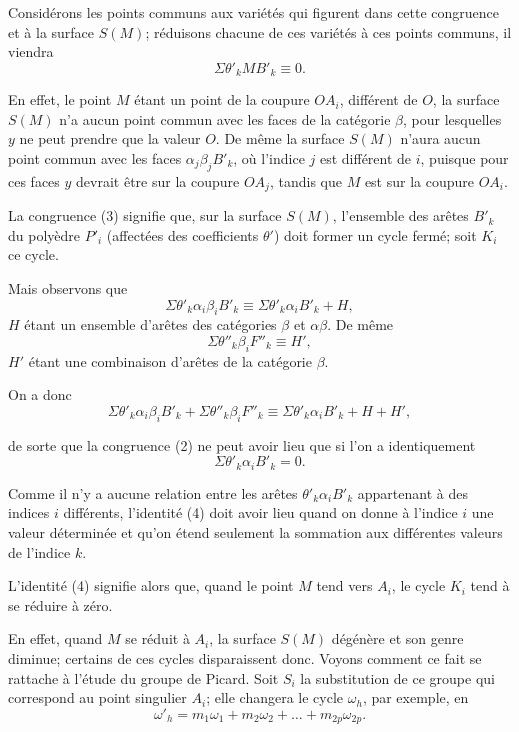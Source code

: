 \documentclass{article}
\begin{document}
Considérons les points communs aux variétés qui figurent dans cette congruence et à la surface $S(M)$; réduisons chacune de ces variétés à ces points communs, il viendra
\[ \Sigma \theta'_{k} MB'_{k} \equiv 0. \tag{3} \]

En effet, le point $M$ étant un point de la coupure $OA_{i}$, différent de $O$, la surface $S(M)$ n'a aucun point commun avec les faces de la catégorie $\beta$, pour lesquelles $y$ ne peut prendre que la valeur $O$. De même la surface $S(M)$ n'aura aucun point commun avec les faces $\alpha_{j}\beta_{j}B'_{k}$, où l'indice $j$ est différent de $i$, puisque pour ces faces $y$ devrait être sur la coupure $OA_{j}$, tandis que $M$ est sur la coupure $OA_{i}$.

La congruence (3) signifie que, sur la surface $S(M)$, l'ensemble des arêtes $B'_{k}$ du polyèdre $P'_{i}$ (affectées des coefficients $\theta'$) doit former un cycle fermé; soit $K_{i}$ ce cycle.

Mais observons que
\[ \Sigma \theta'_{k} \alpha_{i}\beta_{i}B'_{k} \equiv \Sigma \theta'_{k} \alpha_{i}B'_{k} + H, \]
$H$ étant un ensemble d'arêtes des catégories $\beta$ et $\alpha\beta$. De même
\[ \Sigma \theta''_{k} \beta_{i}F''_{k} \equiv H', \]
$H'$ étant une combinaison d'arêtes de la catégorie $\beta$.

On a donc
\[ \Sigma \theta'_{k} \alpha_{i}\beta_{i}B'_{k} + \Sigma \theta''_{k} \beta_{i}F''_{k} \equiv \Sigma \theta'_{k} \alpha_{i}B'_{k} + H + H', \]

de sorte que la congruence (2) ne peut avoir lieu que si l'on a identiquement
\[ \Sigma \theta'_{k} \alpha_{i}B'_{k} = 0. \tag{4} \]

Comme il n'y a aucune relation entre les arêtes $\theta'_{k} \alpha_{i}B'_{k}$ appartenant à des indices $i$ différents, l'identité (4) doit avoir lieu quand on donne à l'indice $i$ une valeur déterminée et qu'on étend seulement la sommation aux différentes valeurs de l'indice $k$.

L'identité (4) signifie alors que, quand le point $M$ tend vers $A_{i}$, le cycle $K_{i}$ tend à se réduire à zéro.

En effet, quand $M$ se réduit à $A_{i}$, la surface $S(M)$ dégénère et son genre diminue; certains de ces cycles disparaissent donc. Voyons comment ce fait se rattache à l'étude du groupe de Picard. Soit $S_{i}$ la substitution de ce groupe qui correspond au point singulier $A_{i}$; elle changera le cycle $\omega_{h}$, par exemple, en
\[ \omega'_{h} = m_{1}\omega_{1} + m_{2}\omega_{2} + \ldots + m_{2p}\omega_{2p}. \]
\end{document}

